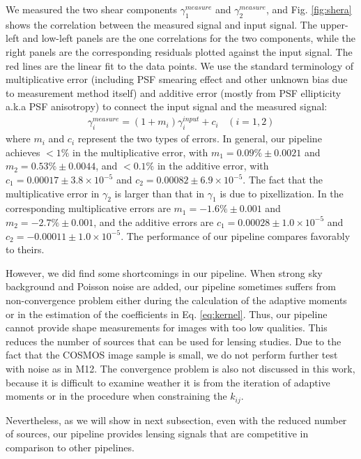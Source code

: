 \documentclass[apj]{emulateapj}
\begin{document}
We measured the two shear components
$\gamma_1^{measure}$ and $\gamma_2^{measure}$, and 
Fig. \ref{fig:shera} shows the correlation between the measured signal
and input signal.  The upper-left and low-left panels are the one
correlations for the two components, while the right panels
are the corresponding residuals plotted against the input signal. 
The red lines are the linear fit to the data points.  
We use the standard terminology of multiplicative error (including PSF smearing
effect and other unknown bias due to measurement method itself) 
and additive error (mostly from PSF ellipticity a.k.a PSF anisotropy)
to connect the input signal and the measured signal:
\begin{gather}
\gamma_i^{measure}=(1+m_i)\gamma_i^{input}+c_i
~~~~(i=1,2)
\end{gather}
where $m_i$ and $c_i$ represent the two types of errors.  
In general, our pipeline achieves $<1\%$ in the multiplicative error, 
with $m_1=0.09\% \pm 0.0021$ and $m_2=0.53\%\pm 0.0044$, 
and $<0.1\%$ in the additive error, with  $c_1= 0.00017\pm
3.8\times 10^{-5}$ and $c_2= 0.00082\pm 6.9\times 10^{-5}$. 
The fact that the multiplicative error in $\gamma_2$ is larger 
than that in $\gamma_1$ is due to pixellization.  
In \citet{Mandelbaum2012} the corresponding multiplicative errors are
$m_1=-1.6\% \pm 0.001$ and $m_2=-2.7\% \pm 0.001$, and the 
additive errors are $c_1= 0.00028\pm 1.0\times 10^{-5}$ and 
$c_2 = -0.00011\pm 1.0\times 10^{-5}$.
The performance of our pipeline compares favorably 
to theirs. 

However, we did find  some shortcomings in our pipeline.  
When strong sky background and Poisson noise are added, 
our pipeline sometimes suffers from non-convergence problem 
either during the calculation of the adaptive moments or 
in the estimation of the coefficients in Eq. \ref{eq:kernel}.
Thus, our pipeline cannot provide shape measurements 
for images with too low qualities.  This reduces the number of 
sources that can be used for lensing studies. Due to the fact
that the COSMOS image sample is small, we do not perform further
test with noise as in M12. The convergence
problem is also not discussed in this work, because it is difficult
to examine weather it is from the iteration of adaptive moments or
in the procedure when constraining the $k_{ij}$.

Nevertheless, as  we will show in next subsection, even with the
reduced number of sources, our pipeline provides 
lensing signals that are competitive in comparison 
to other pipelines.
\end{document}
